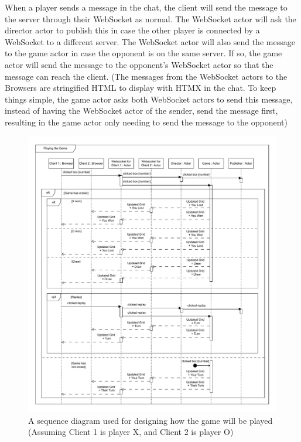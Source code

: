 \documentclass[]{final}
\begin{document}
When a player sends a message in the chat, the client will send the message to
the server through their WebSocket as normal. The WebSocket actor will ask the
director actor to publish this in case the other player is connected by a WebSocket
to a different server. The WebSocket actor will also send the message to the game
actor in case the opponent is on the same server. If so, the game actor will
send the message to the opponent's WebSocket actor so that the message can reach
the client. (The messages from the WebSocket actors to the Browsers are
stringified HTML to display with HTMX in the chat. To keep things simple, the game
actor asks both WebSocket actors to send this message, instead of having
the WebSocket actor of the sender, send the message first, resulting in the game
actor only needing to send the message to the opponent)

\newpage

\begin{figure}[H]
  \centering
  \includegraphics[width=\linewidth]{sequence_playing}
  \caption{A sequence diagram used for designing how the game will be played (Assuming Client 1 is player X, and Client 2 is player O)}
\end{figure}
\end{document}
